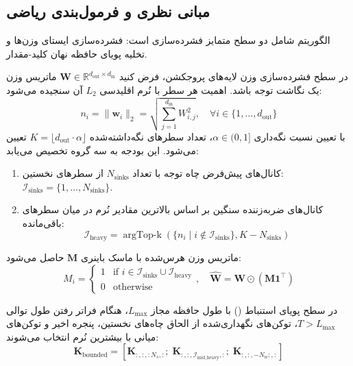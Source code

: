 \subsection{مبانی نظری و فرمول‌بندی ریاضی}
الگوریتم  شامل دو سطح متمایز فشرده‌سازی است: فشرده‌سازی ایستای وزن‌ها و تخلیه پویای حافظه نهان کلید-مقدار.

در سطح فشرده‌سازی وزن لایه‌های پروجکشن، فرض کنید $\mathbf{W} \in \mathbb{R}^{d_{\text{out}} \times d_{\text{in}}}$ ماتریس وزن یک نگاشت توجه باشد. اهمیت هر سطر با نُرم اقلیدسی $L_2$ آن سنجیده می‌شود:
\begin{equation}
n_i = \|\mathbf{w}_i\|_2 = \sqrt{\sum_{j=1}^{d_{\text{in}}} W_{i, j}^2}, \quad \forall i \in \{1, \dots, d_{\text{out}}\}
\end{equation}
با تعیین نسبت نگه‌داری $\alpha \in (0, 1]$، تعداد سطرهای نگه‌داشته‌شده $K = \lfloor d_{\text{out}} \cdot \alpha \rfloor$ تعیین می‌شود. این بودجه به سه گروه تخصیص می‌یابد:
\begin{enumerate}
    \item کانال‌های پیش‌فرض چاه توجه با تعداد $N_{\text{sinks}}$ از سطرهای نخستین: $\mathcal{I}_{\text{sinks}} = \{1, \dots, N_{\text{sinks}}\}$.
    \item کانال‌های ضربه‌زننده سنگین بر اساس بالاترین مقادیر نُرم در میان سطرهای باقی‌مانده:
    \begin{equation}
    \mathcal{I}_{\text{heavy}} = \operatorname{argTop-k}\left(\{n_i \mid i \notin \mathcal{I}_{\text{sinks}}\}, K - N_{\text{sinks}}\right)
    \end{equation}
\end{enumerate}
ماتریس وزن هرس‌شده با ماسک باینری $\mathbf{M}$ حاصل می‌شود:
\begin{equation}
M_i = \begin{cases} 1 & \text{if } i \in \mathcal{I}_{\text{sinks}} \cup \mathcal{I}_{\text{heavy}} \\ 0 & \text{otherwise} \end{cases}, \quad \hat{\mathbf{W}} = \mathbf{W} \odot (\mathbf{M} \mathbf{1}^\top)
\end{equation}

در سطح پویای استنباط () با طول حافظه مجاز $L_{\text{max}}$، هنگام فراتر رفتن طول توالی $T > L_{\text{max}}$، توکن‌های نگهداری‌شده از الحاق چاه‌های نخستین، پنجره اخیر و توکن‌های میانی با بیشترین نُرم انتخاب می‌شوند:
\begin{equation}
\mathbf{K}_{\text{bounded}} = \left[\mathbf{K}_{:, :, :N_s, :}; \; \mathbf{K}_{:, :, \mathcal{I}_{\text{mid\_heavy}}, :}; \; \mathbf{K}_{:, :, -N_w:, :}\right]
\end{equation}

